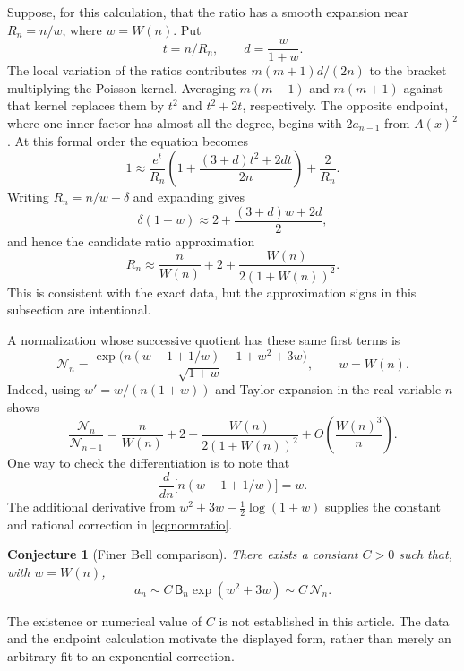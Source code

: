 \documentclass[11pt]{article}
\numberwithin{equation}{section}
\newtheorem{conjecture}[theorem]{Conjecture}
\theoremstyle{remark}
\begin{document}
Suppose, for this calculation, that the ratio has a smooth expansion
near $R_n=n/w$, where $w=W(n)$. Put
\[
 t=n/R_n,\qquad d=\frac{w}{1+w}.
\]
The local variation of the ratios contributes
$m(m+1)d/(2n)$ to the bracket multiplying the Poisson kernel. Averaging
$m(m-1)$ and $m(m+1)$ against that kernel replaces them by $t^2$ and
$t^2+2t$, respectively. The opposite endpoint, where one inner factor
has almost all the degree, begins with $2a_{n-1}$ from $A(x)^2$.
At this formal order the equation becomes
\begin{equation}\label{eq:formalbalance}
 1\approx\frac{e^t}{R_n}
  \left(1+\frac{(3+d)t^2+2dt}{2n}\right)+\frac2{R_n}.
\end{equation}
Writing $R_n=n/w+\delta$ and expanding gives
\[
 \delta(1+w)\approx2+\frac{(3+d)w+2d}{2},
\]
and hence the candidate ratio approximation
\begin{equation}\label{eq:ratiocandidate}
 R_n\approx\frac n{W(n)}+2+
                \frac{W(n)}{2(1+W(n))^2}.
\end{equation}
This is consistent with the exact data, but the approximation signs in
this subsection are intentional.

A normalization whose successive quotient has these same first terms
is
\begin{equation}\label{eq:normalizer}
 \mathcal N_n=
 \frac{\exp\!\bigl(n(w-1+1/w)-1+w^2+3w\bigr)}{\sqrt{1+w}},
 \qquad w=W(n).
\end{equation}
Indeed, using $w'=w/(n(1+w))$ and Taylor expansion in the real variable
$n$ shows
\begin{equation}\label{eq:normratio}
 \frac{\mathcal N_n}{\mathcal N_{n-1}}
 =\frac n{W(n)}+2+
     \frac{W(n)}{2(1+W(n))^2}
      +O\!\left(\frac{W(n)^3}{n}\right).
\end{equation}
One way to check the differentiation is to note that
\[
 \frac d{dn}\bigl[n(w-1+1/w)\bigr]=w.
\]
The additional derivative from $w^2+3w-\tfrac12\log(1+w)$ supplies the
constant and rational correction in \eqref{eq:normratio}.

\begin{conjecture}[Finer Bell comparison]\label{conj:finer}
There exists a constant $C>0$ such that, with $w=W(n)$,
\begin{equation}\label{eq:conjecture}
 a_n\sim C\,\mathsf B_n\exp(w^2+3w)
       \sim C\,\mathcal N_n.
\end{equation}
\end{conjecture}
The existence or numerical value of $C$ is not established in this
article. The data and the endpoint calculation motivate the displayed
form, rather than merely an arbitrary fit to an exponential correction.
\end{document}
